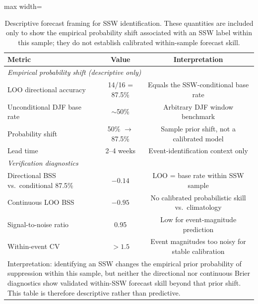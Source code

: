 \documentclass[11pt,letterpaper]{article}
\begin{document}
\begin{table}[htbp]
\centering
\caption{Descriptive forecast framing for SSW identification. These quantities are included only to show the empirical probability shift associated with an SSW label within this sample; they do not establish calibrated within-sample forecast skill.}
\label{tab:directional_skill}
\begin{adjustbox}{max width=\textwidth}
\begin{tabular}{lcc}
\toprule
\textbf{Metric} & \textbf{Value} & \textbf{Interpretation} \\
\midrule
\multicolumn{3}{l}{\emph{Empirical probability shift (descriptive only)}} \\
\midrule
LOO directional accuracy & 14/16 = 87.5\% & Equals the SSW-conditional base rate \\
Unconditional DJF base rate & $\sim$50\% & Arbitrary DJF window benchmark \\
Probability shift & 50\% $\rightarrow$ 87.5\% & Sample prior shift, not a calibrated model \\
Lead time & 2--4 weeks & Event-identification context only \\
\midrule
\multicolumn{3}{l}{\emph{Verification diagnostics}} \\
\midrule
Directional BSS vs.\ conditional 87.5\% & $-0.14$ & LOO = base rate within SSW sample \\
Continuous LOO BSS & $-0.95$ & No calibrated probabilistic skill vs.\ climatology \\
Signal-to-noise ratio & 0.95 & Low for event-magnitude prediction \\
Within-event CV & $> 1.5$ & Event magnitudes too noisy for stable calibration \\
\midrule
\multicolumn{3}{p{14cm}}{Interpretation: identifying an SSW changes the empirical prior probability of suppression within this sample, but neither the directional nor continuous Brier diagnostics show validated within-SSW forecast skill beyond that prior shift. This table is therefore descriptive rather than predictive.} \\
\bottomrule
\end{tabular}
\end{adjustbox}
\end{table}
\end{document}
